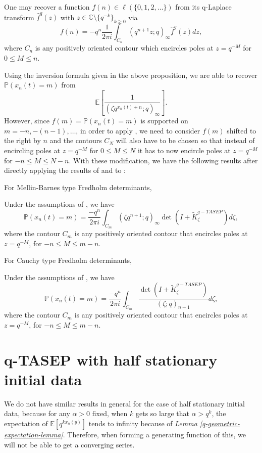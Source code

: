 \begin{proposition}
\label{inversion-formula}
One may recover a function $f(n) \in \ell(\{0,1,2,\dots \})$ from its q-Laplace transform $\hat{f}^q(z)$ with $z \in \mathbb{C} \setminus \{q^{-k}\}_{k \ge 0}$ via
$$f(n) = -q^n \frac{1}{2 \pi i} \int_{C_n} (q^{n+1}z; q)_{\infty} \hat{f}^q(z) dz,$$ 
where $C_n$ is any positively oriented contour which encircles poles at $z = q^{-M}$ for $0 \le M \le n$.
\end{proposition}

Using the inversion formula given in the above proposition, we are able to recover $\mathbb{P}(x_n(t) = m)$ from $$\mathbb{E}\left[ \frac{1}{(\zeta q^{x_n(t) + n}; q)_{\infty}} \right].$$ However, since $f(m) = \mathbb{P}(x_n(t) = m)$ is supported on $m = -n, -(n-1), \dots$, in order to apply , we need to consider $f(m)$ shifted to the right by $n$ and the contours $C_N$ will also have to be chosen so that instead of encircling poles at $z = q^{-M}$ for $0 \le M \le N$ it has to now encircle poles at $z = q^{-M}$ for $-n \le M \le N-n$. With these modification, we have the following results after directly applying the results of  and  to :

For Mellin-Barnes type Fredholm determinants, 
\begin{proposition}
Under the assumptions of , we have $$\mathbb{P}(x_n(t) = m) = \frac{-q^n}{2 \pi i} \int_{C_m} (\zeta q^{n+1}; q)_{\infty} \det(I+\tilde{K}_{\zeta}^{q-TASEP}) d\zeta,$$ where the contour $C_m$ is any positively oriented contour that encircles poles at $z = q^{-M}$, for $-n \le M \le m-n$.
\end{proposition}

For Cauchy type Fredholm determinants, 
\begin{proposition}
Under the assumptions of , we have $$\mathbb{P}(x_n(t) = m) = \frac{-q^n}{2 \pi i} \int_{C_m} \frac{\det(I+\tilde{K}_{\zeta}^{q-TASEP})}{(\zeta;q)_{n+1}} d\zeta,$$ where the contour $C_m$ is any positively oriented contour that encircles poles at $z = q^{-M}$, for $-n \le M \le m-n$.
\end{proposition}
\section{q-TASEP with half stationary initial data}
We do not have similar results in general for the case of half stationary initial data, because for any $\alpha > 0$ fixed, when $k$ gets so large that $\alpha > q^k$, the expectation of $\mathbb{E} \left[ q^{kx_n(y)} \right]$ tends to infinity because of \textit{Lemma \ref{q-geometric-expectation-lemma}}. Therefore, when forming a generating function of this, we will not be able to get a converging series. 